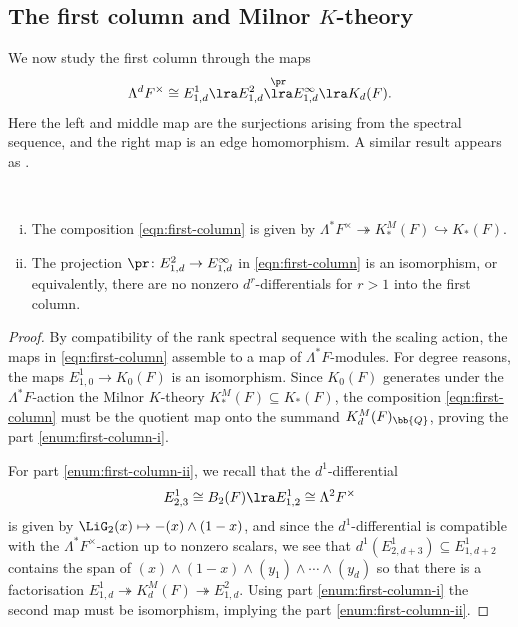 \documentclass[a4paper]{amsart}
\begin{document}
\subsection{The first column and Milnor $K$-theory}

We now study the first column through the maps
\begin{equation}\label{eqn:first-column}\Lambda^d F^\times \cong E^1_{1,d} \lra E^2_{1,d} \overset{\pr}\lra E^\infty_{1,d} \lra K_d(F).\end{equation}
Here the left and middle map are the surjections arising from the spectral sequence, and the right map is an edge homomorphism. A similar result appears as \cite[Theorem 7.2.1]{RognesMotivic}.

\begin{lemma} \label{lem:first-column} \, \begin{enumerate}[(i)]
    \item \label{enum:first-column-i} The composition \eqref{eqn:first-column} is given by $\Lambda^* F^\times \twoheadrightarrow K_*^M(F) \hookrightarrow K_*(F)$.
    \item \label{enum:first-column-ii} The projection $\pr \colon E^2_{1,d} \to E^\infty_{1,d}$ in \eqref{eqn:first-column} is an isomorphism, or equivalently, there are no nonzero $d^r$-differentials for $r>1$ into the first column.
\end{enumerate} 
\end{lemma}

\begin{proof}By compatibility of the rank spectral sequence with the scaling action, the maps in \eqref{eqn:first-column} assemble to a map of $\Lambda^* F$-modules. For degree reasons, the maps $E^1_{1,0} \to K_0(F)$ is an isomorphism. Since $K_0(F)$ generates under the $\Lambda^* F$-action  the Milnor $K$-theory $K^M_*(F) \subseteq K_*(F)$, the composition \eqref{eqn:first-column} must be the quotient map onto the summand $K^M_d(F)_\bb{Q}$, proving the part \eqref{enum:first-column-i}.

For part \eqref{enum:first-column-ii}, we recall that the $d^1$-differential
\[E^1_{2,3} \cong B_2(F) \lra E^1_{1,2} \cong \Lambda^2 F^\times\]
is given by $\LiG_2(x) \mapsto -(x) \wedge (1-x)$, and since the $d^1$-differential is compatible with the $\Lambda^* F^\times$-action up to nonzero scalars, we see that $d^1(E^1_{2,d+3}) \subseteq E^1_{1,d+2}$ contains the span of $(x) \wedge (1-x) \wedge (y_1) \wedge \cdots \wedge (y_d)$ so that there is a factorisation $E^1_{1,d} \twoheadrightarrow K^M_d(F) \twoheadrightarrow E^2_{1,d}$. Using part \eqref{enum:first-column-i} the second map must be isomorphism, implying the part \eqref{enum:first-column-ii}.
\end{proof}
\end{document}
